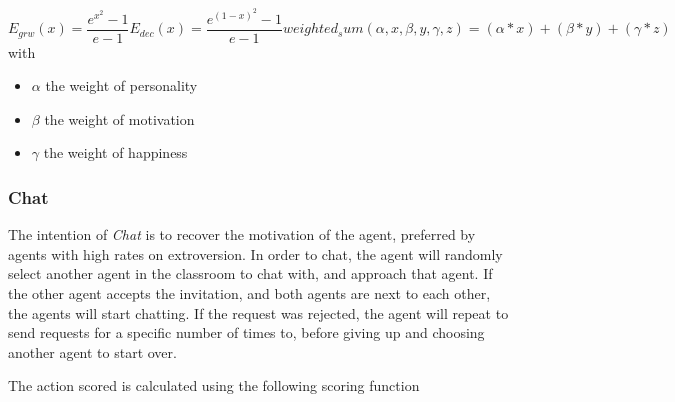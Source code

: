 \begin{subequations} 
\label{eq3}
\begin{equation}
    E_{grw}(x) =  \frac{e^{x^2}-1}{e - 1}
\end{equation}
\begin{equation}
    E_{dec}(x) =  \frac{e^{(1 - x)^2}-1}{e - 1}
\end{equation}
\begin{equation}
    weighted_sum(\alpha,x,\beta,y,\gamma,z) = (\alpha * x) + (\beta * y) + (\gamma * z)
\end{equation}
\end{subequations}
with
\begin{itemize}
    \item $\alpha$ the weight of personality
    \item $\beta$ the weight of motivation
    \item $\gamma$ the weight of happiness
\end{itemize}

\begin{figure}[!h]
    \label{Equatin_figures}
\end{figure}

\subsubsection{Chat}
The intention of \textit{Chat} is to recover the motivation of the agent, preferred
by agents with high rates on extroversion. In order to chat, the agent will
randomly select another agent in the classroom to chat with, and approach that agent.
If the other agent accepts the invitation, and both agents are next to each other,
the agents will start chatting. If the request was rejected, the agent will repeat
to send requests for a specific number of times to, before giving up and choosing
another agent to start over.

The action scored is calculated using the following scoring function

